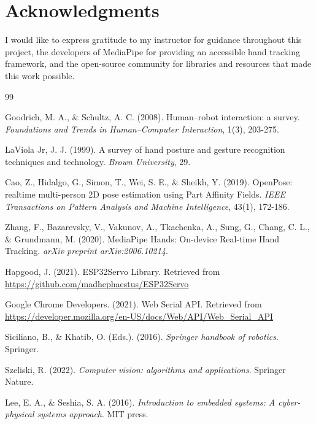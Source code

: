 \documentclass[12pt]{article}
\begin{document}
\section*{Acknowledgments}

I would like to express gratitude to my instructor for guidance throughout this project, the developers of MediaPipe for providing an accessible hand tracking framework, and the open-source community for libraries and resources that made this work possible.

\begin{thebibliography}{99}

Goodrich, M. A., \& Schultz, A. C. (2008). Human--robot interaction: a survey. \textit{Foundations and Trends in Human--Computer Interaction}, 1(3), 203-275.

LaViola Jr, J. J. (1999). A survey of hand posture and gesture recognition techniques and technology. \textit{Brown University}, 29.

Cao, Z., Hidalgo, G., Simon, T., Wei, S. E., \& Sheikh, Y. (2019). OpenPose: realtime multi-person 2D pose estimation using Part Affinity Fields. \textit{IEEE Transactions on Pattern Analysis and Machine Intelligence}, 43(1), 172-186.

Zhang, F., Bazarevsky, V., Vakunov, A., Tkachenka, A., Sung, G., Chang, C. L., \& Grundmann, M. (2020). MediaPipe Hands: On-device Real-time Hand Tracking. \textit{arXiv preprint arXiv:2006.10214}.

Hapgood, J. (2021). ESP32Servo Library. Retrieved from \url{https://github.com/madhephaestus/ESP32Servo}

Google Chrome Developers. (2021). Web Serial API. Retrieved from \url{https://developer.mozilla.org/en-US/docs/Web/API/Web_Serial_API}

Siciliano, B., \& Khatib, O. (Eds.). (2016). \textit{Springer handbook of robotics}. Springer.

Szeliski, R. (2022). \textit{Computer vision: algorithms and applications}. Springer Nature.

Lee, E. A., \& Seshia, S. A. (2016). \textit{Introduction to embedded systems: A cyber-physical systems approach}. MIT press.

\end{thebibliography}

\appendix
\end{document}

